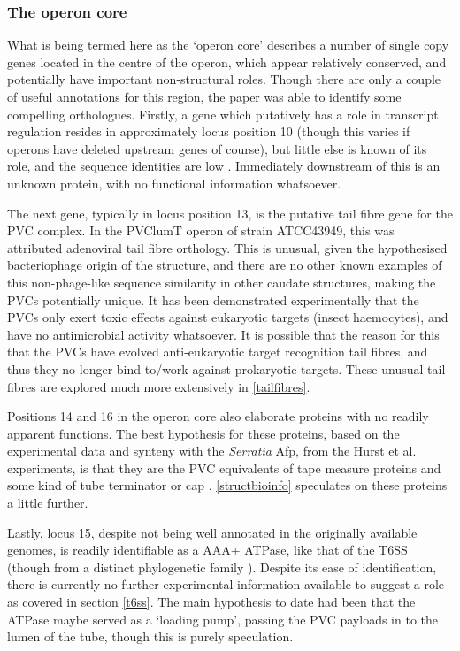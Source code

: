 \subsubsection{The operon core}
What is being termed here as the `operon core' describes a number of single copy genes located in the centre of the operon, which appear relatively conserved, and potentially have important non-structural roles. Though there are only a couple of useful annotations for this region, the \cite{Yang2006} paper was able to identify some compelling orthologues. Firstly, a gene which putatively has a role in transcript regulation resides in approximately locus position 10 (though this varies if operons have deleted upstream genes of course), but little else is known of its role, and the sequence identities are low \citep{Waterfield2009}. Immediately downstream of this is an unknown protein, with no functional information whatsoever.

The next gene, typically in locus position 13, is the putative tail fibre gene for the PVC complex. In the PVClumT operon of strain ATCC43949, this was attributed adenoviral tail fibre orthology. This is unusual, given the hypothesised bacteriophage origin of the structure, and there are no other known examples of this non-phage-like sequence similarity in other caudate structures, making the PVCs potentially unique. It has been demonstrated experimentally that the PVCs only exert toxic effects against eukaryotic targets (insect haemocytes), and have no antimicrobial activity whatsoever. It is possible that the reason for this that the PVCs have evolved anti-eukaryotic target recognition tail fibres, and thus they no longer bind to/work against prokaryotic targets. These unusual tail fibres are explored much more extensively in \vref{tailfibres}.

Positions 14 and 16 in the operon core also elaborate proteins with no readily apparent functions. The best hypothesis for these proteins, based on the experimental data and synteny with the \emph{Serratia} Afp, from the Hurst et al. experiments, is that they are the PVC equivalents of tape measure proteins and some kind of tube terminator or cap \citep{Rybakova2013, Rybakova2015a}. \vref{structbioinfo} speculates on these proteins a little further.

Lastly, locus 15, despite not being well annotated in the originally available genomes, is readily identifiable as a AAA+ ATPase, like that of the T6SS (though from a distinct phylogenetic family \citep{Frickey2004}). Despite its ease of identification, there is currently no further experimental information available to suggest a role as covered in section \vref{t6ss}. The main hypothesis to date had been that the ATPase maybe served as a `loading pump', passing the PVC payloads in to the lumen of the tube, though this is purely speculation.


